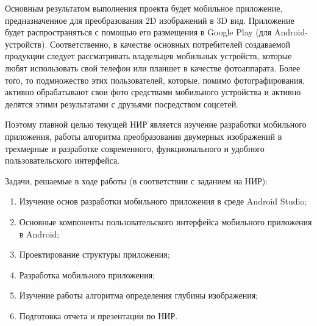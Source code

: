 Основным результатом выполнения проекта будет мобильное приложение, предназначенное для преобразования 2D изображений в 3D вид. Приложение будет распространяться с помощью его размещения в Google Play (для Android-устройств). Соответственно, в качестве основных потребителей создаваемой продукции следует рассматривать владельцев мобильных устройств, которые любят использовать свой телефон или планшет в качестве фотоаппарата. Более того, то подмножество этих пользователей, которые, помимо фотографирования, активно обрабатывают свои фото средствами мобильного устройства и активно делятся этими результатами с друзьями посредством соцсетей.

Поэтому главной целью текущей НИР является изучение разработки мобильного приложения, работы алгоритма преобразования двумерных изображений в трехмерные и разработке современного, функционального и удобного пользовательского интерфейса. 

Задачи, решаемые в ходе работы (в соответствии с заданием на НИР):
\begin{enumerate}
	\item Изучение основ разработки мобильного приложения в среде Android Studio;
	\item Основные компоненты пользовательского интерфейса мобильного приложения в Android;
	\item Проектирование структуры приложения;
	\item Разработка мобильного приложения;
	\item Изучение работы алгоритма определения глубины изображения;
	\item Подготовка отчета и презентации по НИР.
\end{enumerate}